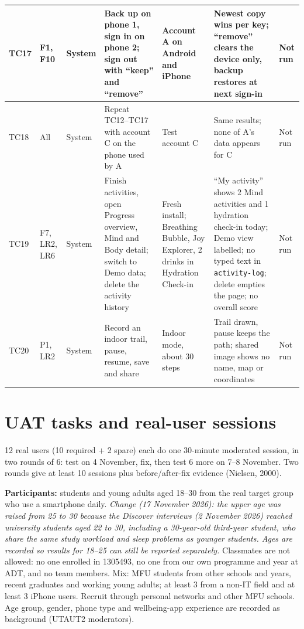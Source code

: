 \documentclass{article}
\begin{document}
{\begin{longtable}{|L{0.95cm}|L{1.35cm}|L{1.55cm}|L{3.0cm}|L{2.75cm}|L{3.85cm}|L{1.1cm}|}
TC17 & F1, F10 & System & Back up on phone 1, sign in on phone 2; sign out with ``keep'' and ``remove'' & Account A on Android and iPhone & Newest copy wins per key; ``remove'' clears the device only, backup restores at next sign-in & Not run \\ \hline
TC18 & All & System & Repeat TC12--TC17 with account C on the phone used by A & Test account C & Same results; none of A's data appears for C & Not run \\ \hline
TC19 & F7, LR2, LR6 & System & Finish activities, open Progress overview, Mind and Body detail; switch to Demo data; delete the activity history & Fresh install; Breathing Bubble, Joy Explorer, 2 drinks in Hydration Check-in & ``My activity'' shows 2 Mind activities and 1 hydration check-in today; Demo view labelled; no typed text in \texttt{activity-log}; delete empties the page; no overall score & Not run \\ \hline
TC20 & P1, LR2 & System & Record an indoor trail, pause, resume, save and share & Indoor mode, about 30 steps & Trail drawn, pause keeps the path; shared image shows no name, map or coordinates & Not run \\ \hline
\end{longtable}
}

\section{UAT tasks and real-user sessions}

12 real users (10 required + 2 spare) each do one 30-minute moderated session, in two rounds of 6: test on 4 November, fix, then test 6 more on 7--8 November. Two rounds give at least 10 sessions plus before/after-fix evidence (Nielsen, 2000).

\textbf{Participants:} students and young adults aged 18--30 from the real target group who use a smartphone daily. \textit{Change (17 November 2026): the upper age was raised from 25 to 30 because the Discover interviews (2 November 2026) reached university students aged 22 to 30, including a 30-year-old third-year student, who share the same study workload and sleep problems as younger students. Ages are recorded so results for 18--25 can still be reported separately.} Classmates are not allowed: no one enrolled in 1305493, no one from our own programme and year at ADT, and no team members. Mix: MFU students from other schools and years, recent graduates and working young adults; at least 3 from a non-IT field and at least 3 iPhone users. Recruit through personal networks and other MFU schools. Age group, gender, phone type and wellbeing-app experience are recorded as background (UTAUT2 moderators).
\end{document}
